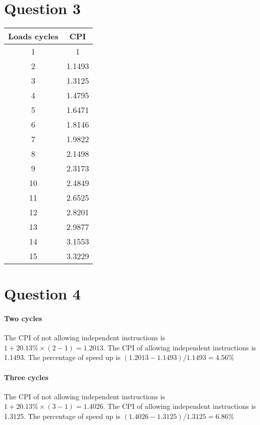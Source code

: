 \documentclass[12pt,letterpaper]{article}
\begin{document}
\section*{Question 3}
\begin{tabular}{|c|c|}
\hline 
Loads cycles & CPI \\ 
\hline 
1 & 1 \\ 
\hline 
2 & 1.1493 \\ 
\hline 
3 & 1.3125 \\ 
\hline 
4 & 1.4795 \\ 
\hline 
5 & 1.6471 \\ 
\hline 
6 & 1.8146 \\ 
\hline 
7 & 1.9822 \\ 
\hline 
8 & 2.1498 \\ 
\hline 
9 & 2.3173 \\ 
\hline 
10 & 2.4849 \\ 
\hline 
11 & 2.6525 \\ 
\hline 
12 & 2.8201 \\ 
\hline 
13 & 2.9877 \\ 
\hline 
14 & 3.1553 \\ 
\hline 
15 & 3.3229 \\ 
\hline 
\end{tabular} 

\section*{Question 4}
\paragraph*{Two cycles}
The CPI of not allowing independent instructions is $1+20.13\% \times
 (2-1) = 1.2013$. The CPI of allowing independent instructions is 1.1493.
 The percentage of speed up is $(1.2013-1.1493)/1.1493=4.56\%$
 
 \paragraph*{Three cycles}
 The CPI of not allowing independent instructions is $1+20.13\% \times
 (3-1) = 1.4026 $. The CPI of allowing independent instructions is 1.3125.
 The percentage of speed up is $(1.4026 -1.3125)/1.3125=6.86\%$
 
\end{document}
